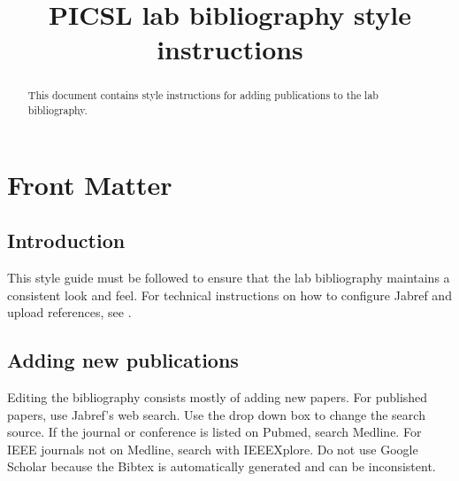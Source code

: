 \documentclass{InsightArticle}
\title{PICSL lab bibliography style instructions}
\begin{document}
%
% 


\ifpdf
\else
\fi


\maketitle


\ifhtml
\chapter*{Front Matter\label{front}}
\fi



\begin{abstract}
\noindent This document contains style instructions for adding publications to the lab bibliography.
\end{abstract}

\tableofcontents
\newpage

\section{Introduction}

This style guide must be followed to ensure that the lab bibliography maintains a consistent look and feel. For technical instructions on how to configure Jabref and upload references, see .

\section{Adding new publications}

Editing the bibliography consists mostly of adding new papers. For published papers, use Jabref's web search. Use the drop down box to change the search source. If the journal or conference is listed on Pubmed, search Medline. For IEEE journals not on Medline, search with IEEEXplore. Do not use Google Scholar because the Bibtex is automatically generated and can be inconsistent.
\end{document}
